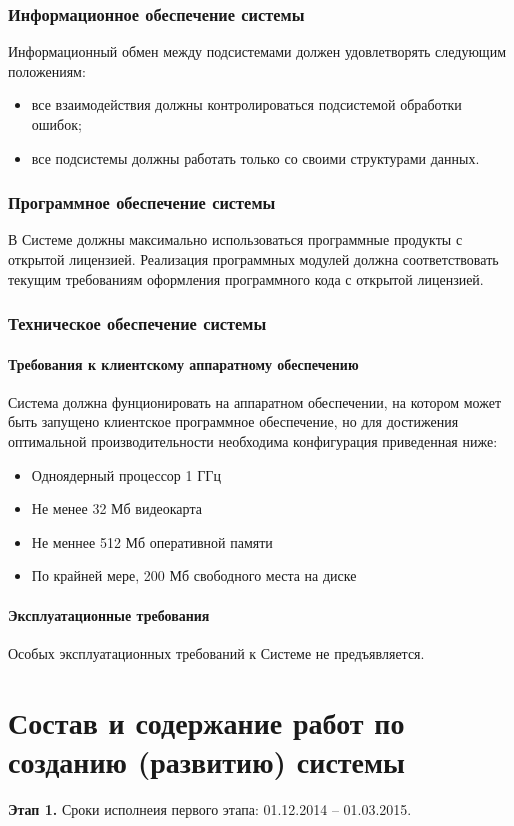 \subsection{Информационное обеспечение системы}
Информационный обмен между подсистемами должен удовлетворять следующим положениям:
\begin{itemize}
    \item все взаимодействия должны контролироваться подсистемой обработки ошибок;
    \item все подсистемы должны работать только со своими структурами данных.
\end{itemize}

\subsection{Программное обеспечение системы}
В Системе должны максимально использоваться программные продукты с открытой лицензией. 
Реализация программных модулей должна соответствовать текущим требованиям оформления 
программного кода с открытой лицензией.

\subsection{Техническое обеспечение системы}
\subsubsection{Требования к клиентскому аппаратному обеспечению}
Система должна фунционировать на аппаратном обеспечении, на котором может быть запущено 
клиентское программное обеспечение, но для достижения оптимальной производительности 
необходима конфигурация приведенная ниже:
\begin{itemize}
    \item Одноядерный процессор 1 ГГц
    \item Не менее 32 Мб видеокарта
    \item Не меннее 512 Мб оперативной памяти
    \item По крайней мере, 200 Мб свободного места на диске
\end{itemize}

\subsubsection{Эксплуатационные требования}
Особых эксплуатационных требований к Системе не предъявляется.

\chapter{Состав и содержание работ по созданию (развитию) системы}
\textbf{Этап 1.}
Сроки исполнеия первого этапа: 01.12.2014 -- 01.03.2015.

